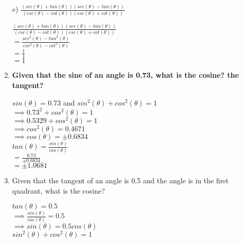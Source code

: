 \begin{enumerate}
{\tab e) $\frac{(sec(\theta) + tan(\theta))(sec(\theta) - tan(\theta))}{(csc(\theta) - cot(\theta))(csc(\theta) + cot(\theta))}$\\}

\tab\tab $\frac{(sec(\theta) + tan(\theta))(sec(\theta) - tan(\theta))}{(csc(\theta) - cot(\theta))(csc(\theta) + cot(\theta))}$\\

\tab\tab $= \frac{sec^2(\theta) - tan^2(\theta)}{csc^2(\theta) - cot^2(\theta)}$\\

\tab\tab $= \frac{1}{1}$\\

\tab\tab $= 1$\\

\item{\bf Given that the sine of an angle is 0.73, what is the cosine?  the tangent?\\}

\tab $sin(\theta) = 0.73$ and $sin^2(\theta) + cos^2(\theta) = 1$\\

\tab $\implies 0.73^2 + cos^2(\theta) = 1$\\

\tab $\implies 0.5329 + cos^2(\theta) = 1$\\

\tab $\implies cos^2(\theta) = 0.4671$\\

\tab $\implies cos(\theta) = \pm 0.6834$\\

\tab $tan(\theta) = \frac{sin(\theta)}{cos(\theta)}$\\

\tab $= \frac{0.73}{\pm 0.6834}$\\

\tab $= \pm 1.0681$\\

\item{Given that the tangent of an angle is 0.5 and the angle is in the first quadrant, what is the cosine?}

\tab $tan(\theta) = 0.5$\\

\tab $\implies \frac{sin(\theta)}{cos(\theta)} = 0.5$\\

\tab $\implies sin(\theta) = 0.5cos(\theta)$\\

\tab $sin^2(\theta) + cos^2(\theta) = 1$\\


\end{enumerate}

